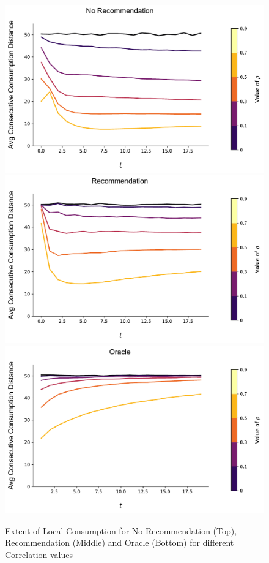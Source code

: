 \documentclass[sigconf]{acmart}
\begin{document}
\begin{figure}[t]
\includegraphics[width=\linewidth]{figures/rho_consumption_dist_N_200T_20.pdf}\\
\includegraphics[width=\linewidth]{figures/rho_consumption_dist_N_200T_20_partial.pdf}\\
\includegraphics[width=\linewidth]{figures/rho_consumption_dist_N_200T_20_omni.pdf}\\
\caption{Extent of Local Consumption for No Recommendation (Top), Recommendation (Middle) and Oracle (Bottom) for different Correlation values}
\label{fig:local_consumption_across_rho}
\end{figure}
\end{document}
